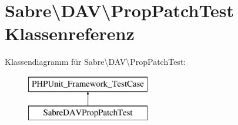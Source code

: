 \hypertarget{class_sabre_1_1_d_a_v_1_1_prop_patch_test}{}\section{Sabre\textbackslash{}D\+AV\textbackslash{}Prop\+Patch\+Test Klassenreferenz}
\label{class_sabre_1_1_d_a_v_1_1_prop_patch_test}
Klassendiagramm für Sabre\textbackslash{}D\+AV\textbackslash{}Prop\+Patch\+Test\+:\begin{figure}[H]
\begin{center}
\leavevmode
\includegraphics[height=2.000000cm]{class_sabre_1_1_d_a_v_1_1_prop_patch_test}
\end{center}
\end{figure}
